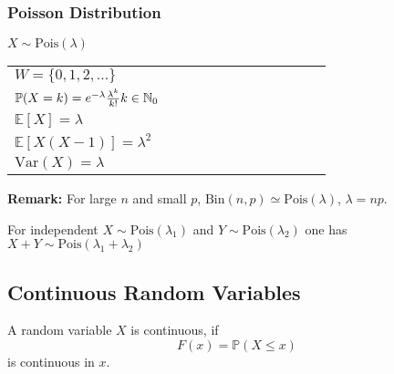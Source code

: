 \renewcommand{\arraystretch}{1}
\setlength\tabcolsep{\oldtabcolsep}


\subsubsection{Poisson Distribution}
$X \sim \mathrm{Pois}(\lambda)$

\renewcommand{\arraystretch}{1.3}
\setlength{\oldtabcolsep}{\tabcolsep}\setlength\tabcolsep{3pt}
\begin{tabularx}{\linewidth}{@{}p{0.5\linewidth}p{0.49\linewidth}@{}}
    $W=\{0,1,2,\ldots\}$                                                        &
    \multirow{4}{*}{
        
    }                                                                             \\
    $\mathbb{P}(X=k)=e^{-\lambda}\frac{\lambda^k}{k!}\newline k\in\mathbb{N}_0$ & \\
    $\mathbb{E}[X] = \lambda$                                                   & \\
    $\mathbb{E}[X(X-1)] = \lambda^2$                                            & \\
    $\mathrm{Var}(X) = \lambda$                                                 &
\end{tabularx}
\renewcommand{\arraystretch}{1}
\setlength\tabcolsep{\oldtabcolsep}
\textbf{Remark:} For large $n$ and small $p$, $\mathrm{Bin}(n,p)\simeq \mathrm{Pois}(\lambda)$, $\lambda=np$.

For independent $X \sim \mathrm{Pois}(\lambda_1)$ and $Y \sim \mathrm{Pois}(\lambda_2)$ one has $X+Y \sim \mathrm{Pois}(\lambda_1 +\lambda_2)$

\subsection{Continuous Random Variables}
A random variable $X$ is continuous, if
\noindent\begin{equation*}
    F(x)=\mathbb{P}(X\leq x)
\end{equation*}
is continuous in $x$.


